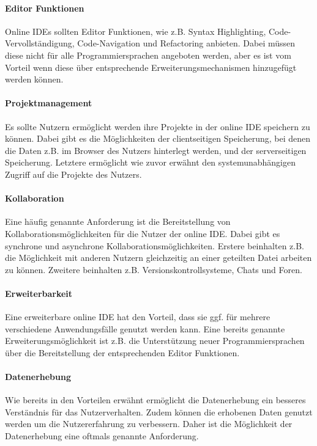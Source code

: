 \paragraph{Editor Funktionen}
Online IDEs sollten Editor Funktionen, wie z.B. Syntax Highlighting, Code-Vervollständigung, Code-Navigation und Refactoring anbieten. Dabei müssen diese nicht für alle Programmiersprachen angeboten werden, aber es ist vom Vorteil wenn diese über entsprechende Erweiterungsmechanismen hinzugefügt werden können.

\paragraph{Projektmanagement}
Es sollte Nutzern ermöglicht werden ihre Projekte in der online IDE speichern zu können. Dabei gibt es die Möglichkeiten der clientseitigen Speicherung, bei denen die Daten z.B. im Browser des Nutzers hinterlegt werden, und der serverseitigen Speicherung. Letztere ermöglicht wie zuvor erwähnt den systemunabhängigen Zugriff auf die Projekte des Nutzers.

\paragraph{Kollaboration}
Eine häufig genannte Anforderung ist die Bereitstellung von Kollaborationsmöglichkeiten für die Nutzer der online IDE. Dabei gibt es synchrone und asynchrone Kollaborationsmöglichkeiten. Erstere beinhalten z.B. die Möglichkeit mit anderen Nutzern gleichzeitig an einer geteilten Datei arbeiten zu können. Zweitere beinhalten z.B. Versionskontrollsysteme, Chats und Foren.

\paragraph{Erweiterbarkeit}
Eine erweiterbare online IDE hat den Vorteil, dass sie ggf. für mehrere verschiedene Anwendungsfälle genutzt werden kann. Eine bereits genannte Erweiterungsmöglichkeit ist z.B. die Unterstützung neuer Programmiersprachen über die Bereitstellung der entsprechenden Editor Funktionen.

\paragraph{Datenerhebung}
Wie bereits in den Vorteilen erwähnt ermöglicht die Datenerhebung ein besseres Verständnis für das Nutzerverhalten. Zudem können die erhobenen Daten genutzt werden um die Nutzererfahrung zu verbessern. Daher ist die Möglichkeit der Datenerhebung eine oftmals genannte Anforderung.
